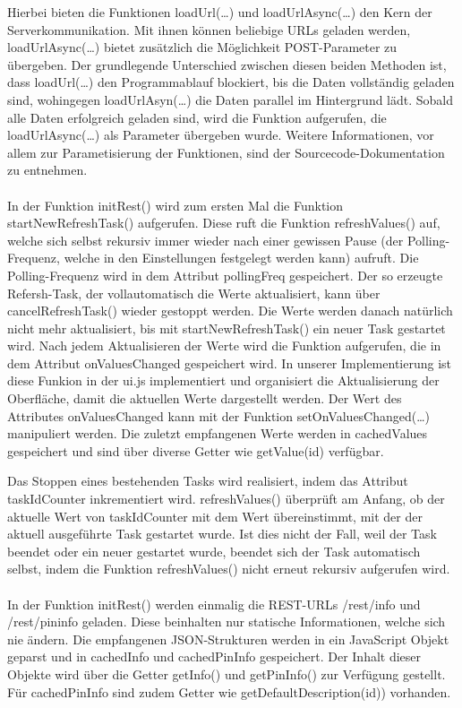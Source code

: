Hierbei bieten die Funktionen \textrm{loadUrl(\ldots)} und
\textrm{loadUrlAsync(\ldots)} den Kern der Serverkommunikation. Mit ihnen können
beliebige URLs geladen werden, \textrm{loadUrlAsync(\ldots)} bietet zusätzlich
die Möglichkeit POST-Parameter zu übergeben. Der grundlegende Unterschied
zwischen diesen beiden Methoden ist, dass \textrm{loadUrl(\ldots)} den
Programmablauf blockiert, bis die Daten vollständig geladen sind, wohingegen
\textrm{loadUrlAsyn(\ldots)} die Daten parallel im Hintergrund lädt. Sobald alle
Daten erfolgreich geladen sind, wird die Funktion aufgerufen, die
\textrm{loadUrlAsync(\ldots)} als Parameter übergeben wurde. Weitere
Informationen, vor allem zur Parametisierung der Funktionen, sind der
Sourcecode-Dokumentation zu entnehmen.\\
\\
In der Funktion \textrm{initRest()} wird zum ersten Mal die Funktion
\textrm{startNewRefreshTask()} aufgerufen. Diese ruft die Funktion
\textrm{refreshValues()} auf, welche sich selbst rekursiv immer wieder nach
einer gewissen Pause (der Polling-Frequenz, welche in den Einstellungen
festgelegt werden kann) aufruft. Die Polling-Frequenz wird in dem Attribut
\textrm{pollingFreq} gespeichert. Der so erzeugte Refersh-Task, der
vollautomatisch die Werte aktualisiert, kann über \textrm{cancelRefreshTask()}
wieder gestoppt werden. Die Werte werden danach natürlich nicht mehr
aktualisiert, bis mit \textrm{startNewRefreshTask()} ein neuer Task gestartet
wird. Nach jedem Aktualisieren der Werte wird die Funktion aufgerufen, die in
dem Attribut \textrm{onValuesChanged} gespeichert wird. In unserer
Implementierung ist diese Funkion in der \textrm{ui.js} implementiert und
organisiert die Aktualisierung der Oberfläche, damit die aktuellen Werte
dargestellt werden. Der Wert des Attributes \textrm{onValuesChanged} kann mit
der Funktion \textrm{setOnValuesChanged(\ldots)} manipuliert werden. Die zuletzt
empfangenen Werte werden in \textrm{cachedValues} gespeichert und sind über
diverse Getter wie \textrm{getValue(id)} verfügbar.

Das Stoppen eines bestehenden Tasks wird realisiert, indem das Attribut
\textrm{taskIdCounter} inkrementiert wird. \textrm{refreshValues()} überprüft am
Anfang, ob der aktuelle Wert von \textrm{taskIdCounter} mit dem Wert
übereinstimmt, mit der der aktuell ausgeführte Task gestartet wurde. Ist dies
nicht der Fall, weil der Task beendet oder ein neuer gestartet wurde, beendet
sich der Task automatisch selbst, indem die Funktion \textrm{refreshValues()}
nicht erneut rekursiv aufgerufen wird.\\
\\
In der Funktion \textrm{initRest()} werden einmalig die REST-URLs
\textrm{/rest/info} und \textrm{/rest/pininfo} geladen. Diese beinhalten nur
statische Informationen, welche sich nie ändern. Die empfangenen JSON-Strukturen
werden in ein JavaScript Objekt geparst und in \textrm{cachedInfo} und
\textrm{cachedPinInfo} gespeichert. Der Inhalt dieser Objekte wird über
die Getter \textrm{getInfo()} und \textrm{getPinInfo()} zur Verfügung gestellt.
Für \textrm{cachedPinInfo} sind zudem Getter wie
\textrm{getDefaultDescription(id))} vorhanden.


